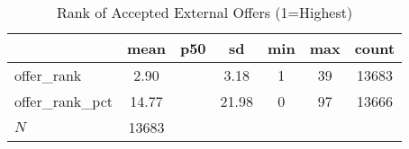 \begin{table}[htbp]\centering
\def\sym#1{\ifmmode^{#1}\else\(^{#1}\)\fi}
\caption{Rank of Accepted External Offers (1=Highest)}
\begin{tabular}{l*{1}{cccccc}}
\hline\hline
            &        mean&         p50&          sd&         min&         max&       count\\
\hline
offer\_rank  &        2.90&            &        3.18&           1&          39&       13683\\
offer\_rank\_pct&       14.77&            &       21.98&           0&          97&       13666\\
\hline
\(N\)       &       13683&            &            &            &            &            \\
\hline\hline
\end{tabular}
\end{table}
